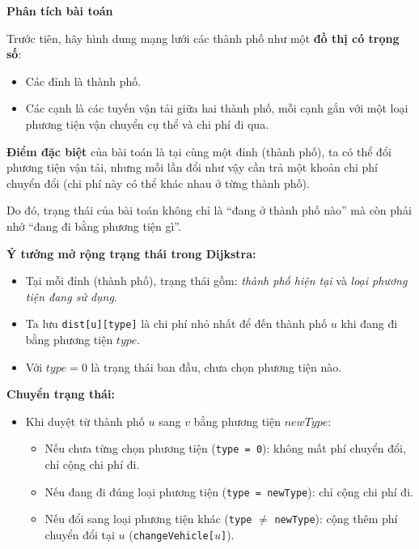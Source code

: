 \textbf{Phân tích bài toán}

Trước tiên, hãy hình dung mạng lưới các thành phố như một \textbf{đồ thị có trọng số}:
\begin{itemize}
    \item Các đỉnh là thành phố.
    \item Các cạnh là các tuyến vận tải giữa hai thành phố, mỗi cạnh gắn với một loại phương tiện vận chuyển cụ thể và chi phí đi qua.
\end{itemize}

\textbf{Điểm đặc biệt} của bài toán là tại cùng một đỉnh (thành phố), ta có thể đổi phương tiện vận tải, nhưng mỗi lần đổi như vậy cần trả một khoản chi phí chuyển đổi (chi phí này có thể khác nhau ở từng thành phố).

Do đó, trạng thái của bài toán không chỉ là “đang ở thành phố nào” mà còn phải nhớ “đang đi bằng phương tiện gì”. 

\textbf{Ý tưởng mở rộng trạng thái trong Dijkstra:}
\begin{itemize}
    \item Tại mỗi đỉnh (thành phố), trạng thái gồm: \textit{thành phố hiện tại} và \textit{loại phương tiện đang sử dụng}.
    \item Ta lưu \texttt{dist[u][type]} là chi phí nhỏ nhất để đến thành phố $u$ khi đang đi bằng phương tiện $type$.
    \item Với $type = 0$ là trạng thái ban đầu, chưa chọn phương tiện nào.
\end{itemize}

\textbf{Chuyển trạng thái:}
\begin{itemize}
    \item Khi duyệt từ thành phố $u$ sang $v$ bằng phương tiện $newType$:
        \begin{itemize}
            \item Nếu chưa từng chọn phương tiện (\texttt{type = 0}): không mất phí chuyển đổi, chỉ cộng chi phí đi.
            \item Nếu đang đi đúng loại phương tiện (\texttt{type = newType}): chỉ cộng chi phí đi.
            \item Nếu đổi sang loại phương tiện khác (\texttt{type} $\neq$ \texttt{newType}): cộng thêm phí chuyển đổi tại $u$ (\texttt{changeVehicle[$u$]}).
        \end{itemize}
\end{itemize}

